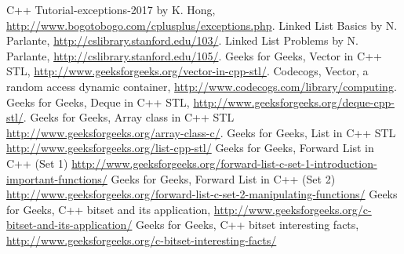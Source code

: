 \begin{thebibliography}{9}
C++ Tutorial-exceptions-2017 by K. Hong, \href{http://www.bogotobogo.com/cplusplus/exceptions.php}{http://www.bogotobogo.com/cplusplus/exceptions.php}.
Linked List Basics by N. Parlante, \href{http://cslibrary.stanford.edu/103/}{http://cslibrary.stanford.edu/103/}.
Linked List Problems by N. Parlante, \href{http://cslibrary.stanford.edu/105/}{http://cslibrary.stanford.edu/105/}.
Geeks for Geeks, Vector in C++ STL, \href{http://www.geeksforgeeks.org/vector-in-cpp-stl/}{http://www.geeksforgeeks.org/vector-in-cpp-stl/}.
Codecogs, Vector, a random access dynamic container, \href{http://www.codecogs.com/library/computing/stl/containers/sequences/vector.php}{http://www.codecogs.com/library/computing}.
Geeks for Geeks, Deque in C++ STL, \href{http://www.geeksforgeeks.org/deque-cpp-stl/}{http://www.geeksforgeeks.org/deque-cpp-stl/}.
Geeks for Geeks, Array class in C++ STL \href{http://www.geeksforgeeks.org/array-class-c/}{http://www.geeksforgeeks.org/array-class-c/}.
Geeks for Geeks, List in C++ STL  \href{http://www.geeksforgeeks.org/list-cpp-stl/}{http://www.geeksforgeeks.org/list-cpp-stl/}
Geeks for Geeks, Forward List in C++ (Set 1) \href{http://www.geeksforgeeks.org/forward-list-c-set-1-introduction-important-functions/}{http://www.geeksforgeeks.org/forward-list-c-set-1-introduction-important-functions/}
Geeks for Geeks, Forward List in C++ (Set 2) \href{http://www.geeksforgeeks.org/forward-list-c-set-2-manipulating-functions/}{http://www.geeksforgeeks.org/forward-list-c-set-2-manipulating-functions/}
Geeks for Geeks, C++ bitset and its application, \href{http://www.geeksforgeeks.org/c-bitset-and-its-application/}{http://www.geeksforgeeks.org/c-bitset-and-its-application/}
Geeks for Geeks, C++ bitset interesting facts, \href{http://www.geeksforgeeks.org/c-bitset-interesting-facts/}{http://www.geeksforgeeks.org/c-bitset-interesting-facts/}
\end{thebibliography}

